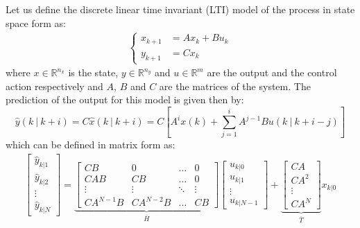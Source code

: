 Let us define the discrete linear time invariant (LTI) model of the process in state space form as:
\begin{equation} \label{system_evolution}
	\begin{split}
		\begin{cases}
			x_{k+1}&=Ax_k+Bu_k \\
			y_{k+1}&=Cx_k
		\end{cases}
	\end{split}
\end{equation}
where $x \in \mathbb{R}^{n_x}$ is the state, $y \in \mathbb{R}^{n_y}$ and $u \in \mathbb{R}^m$ are the output and the control action respectively and $A$, $B$ and $C$ are the matrices of the system. The prediction of the output for this model is given then by:
\begin{equation}\label{system_prediction}
	\hat{y}(k\ |\ k+i)=C\hat{x}(k\ |\ k+i)=C\left[A^i x(k) + \sum_{j=1}^{i} A^{j-1}Bu(k\ |\ k+i-j)\right]
\end{equation}
which can be defined in matrix form as: 
\begin{equation}
\begin{split}
	\left[ \begin{matrix} \hat{y}_{k|1} \\ \hat{y}_{k|2} \\ \vdots \\ \hat{y}_{k|N} \end{matrix} \right] = \underbrace{\left[ \begin{matrix}
	CB		 & 	0	    &	\dots	&	0 		\\
	CAB		 & 	CB	    &	\dots	&	0 		\\
	\vdots	 &  \vdots  &	\ddots	&	\vdots	\\
	CA^{N-1}B & CA^{N-2}B &   \dots   &	CB			
	\end{matrix}\right]}_{\bar{H}}\left[ \begin{matrix} u_{k|0} \\ u_{k|1} \\ \vdots \\ u_{k|N-1} \end{matrix} \right]+ \underbrace{\left[ \begin{matrix} CA \\ CA^2 \\ \vdots \\ CA^N \end{matrix} \right]}_{\bar{T}}x_{k|0}
	\end{split}	
\end{equation}
